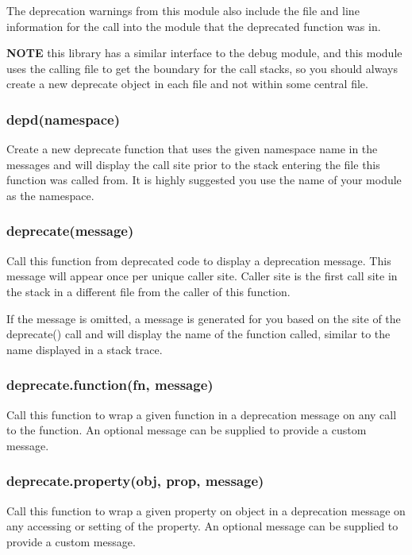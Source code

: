 The deprecation warnings from this module also include the file and line information for the call into the module that the deprecated function was in.

{\bfseries N\+O\+T\+E} this library has a similar interface to the {\ttfamily debug} module, and this module uses the calling file to get the boundary for the call stacks, so you should always create a new {\ttfamily deprecate} object in each file and not within some central file.

\subsubsection*{depd(namespace)}

Create a new deprecate function that uses the given namespace name in the messages and will display the call site prior to the stack entering the file this function was called from. It is highly suggested you use the name of your module as the namespace.

\subsubsection*{deprecate(message)}

Call this function from deprecated code to display a deprecation message. This message will appear once per unique caller site. Caller site is the first call site in the stack in a different file from the caller of this function.

If the message is omitted, a message is generated for you based on the site of the {\ttfamily deprecate()} call and will display the name of the function called, similar to the name displayed in a stack trace.

\subsubsection*{deprecate.\+function(fn, message)}

Call this function to wrap a given function in a deprecation message on any call to the function. An optional message can be supplied to provide a custom message.

\subsubsection*{deprecate.\+property(obj, prop, message)}

Call this function to wrap a given property on object in a deprecation message on any accessing or setting of the property. An optional message can be supplied to provide a custom message.

